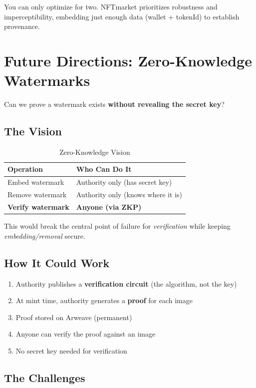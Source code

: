 \documentclass[11pt,a4paper]{article}
\begin{document}
You can only optimize for two. NFTmarket prioritizes robustness and imperceptibility, embedding just enough data (wallet + tokenId) to establish provenance.

\newpage
\section{Future Directions: Zero-Knowledge Watermarks}

Can we prove a watermark exists \textbf{without revealing the secret key}?

\subsection{The Vision}

\begin{table}[h]
\centering
\begin{tabular}{@{}ll@{}}
\toprule
\textbf{Operation} & \textbf{Who Can Do It} \\
\midrule
Embed watermark & Authority only (has secret key) \\
Remove watermark & Authority only (knows where it is) \\
\textbf{Verify watermark} & \textbf{Anyone (via ZKP)} \\
\bottomrule
\end{tabular}
\caption{Zero-Knowledge Vision}
\end{table}

This would break the central point of failure for \textit{verification} while keeping \textit{embedding/removal} secure.

\subsection{How It Could Work}

\begin{enumerate}
    \item Authority publishes a \textbf{verification circuit} (the algorithm, not the key)
    \item At mint time, authority generates a \textbf{proof} for each image
    \item Proof stored on Arweave (permanent)
    \item Anyone can verify the proof against an image
    \item No secret key needed for verification
\end{enumerate}

\subsection{The Challenges}
\end{document}
